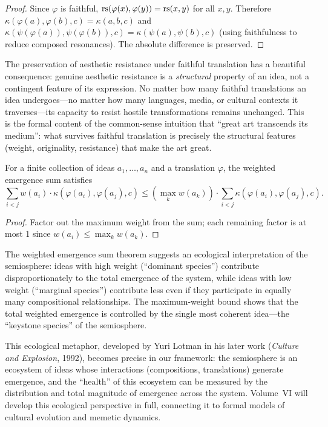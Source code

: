 \begin{proof}
Since $\varphi$ is faithful, $\mathrm{rs}(\varphi(x), \varphi(y)) = \mathrm{rs}(x, y)$ for all $x, y$.  Therefore $\kappa(\varphi(a), \varphi(b), c) = \kappa(a, b, c)$ and $\kappa(\psi(\varphi(a)), \psi(\varphi(b)), c) = \kappa(\psi(a), \psi(b), c)$ (using faithfulness to reduce composed resonances).  The absolute difference is preserved.
\end{proof}

\begin{remark}
The preservation of aesthetic resistance under faithful translation has a beautiful consequence: genuine aesthetic resistance is a \emph{structural} property of an idea, not a contingent feature of its expression.  No matter how many faithful translations an idea undergoes---no matter how many languages, media, or cultural contexts it traverses---its capacity to resist hostile transformations remains unchanged.  This is the formal content of the common-sense intuition that ``great art transcends its medium'': what survives faithful translation is precisely the structural features (weight, originality, resistance) that make the art great.
\end{remark}

\begin{theorem}
\label{thm:weighted-emergence-sum}
For a finite collection of ideas $a_1, \ldots, a_n$ and a translation $\varphi$, the weighted emergence sum satisfies
\[
  \sum_{i < j} w(a_i) \cdot \kappa(\varphi(a_i), \varphi(a_j), c) \leq \left(\max_k w(a_k)\right) \cdot \sum_{i < j} \kappa(\varphi(a_i), \varphi(a_j), c).
\]
\end{theorem}

\begin{proof}
Factor out the maximum weight from the sum; each remaining factor is at most 1 since $w(a_i) \leq \max_k w(a_k)$.
\end{proof}

\begin{interpretation}
\label{interp:ecology-semiosphere}
The weighted emergence sum theorem suggests an ecological interpretation of the semiosphere: ideas with high weight (``dominant species'') contribute disproportionately to the total emergence of the system, while ideas with low weight (``marginal species'') contribute less even if they participate in equally many compositional relationships.  The maximum-weight bound shows that the total weighted emergence is controlled by the single most coherent idea---the ``keystone species'' of the semiosphere.

This ecological metaphor, developed by Yuri Lotman in his later work (\textit{Culture and Explosion}, 1992), becomes precise in our framework: the semiosphere is an ecosystem of ideas whose interactions (compositions, translations) generate emergence, and the ``health'' of this ecosystem can be measured by the distribution and total magnitude of emergence across the system.  Volume~VI will develop this ecological perspective in full, connecting it to formal models of cultural evolution and memetic dynamics.
\end{interpretation}

